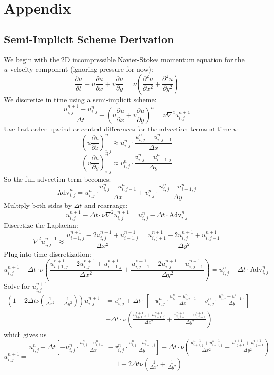 \section{Appendix}
\subsection{Semi-Implicit Scheme Derivation}

We begin with the 2D incompressible Navier-Stokes momentum equation for the $u$-velocity component (ignoring pressure for now):
\[
\frac{\partial u}{\partial t} + u \frac{\partial u}{\partial x} + v \frac{\partial u}{\partial y} = \nu \left( \frac{\partial^2 u}{\partial x^2} + \frac{\partial^2 u}{\partial y^2} \right)
\]
We discretize in time using a semi-implicit scheme:
\[
\frac{u^{n+1}_{i,j} - u^n_{i,j}}{\Delta t} + \left( u \frac{\partial u}{\partial x} + v \frac{\partial u}{\partial y} \right)^n = \nu \nabla^2 u^{n+1}_{i,j}
\]
Use first-order upwind or central differences for the advection terms at time $n$:
\[
\left( u \frac{\partial u}{\partial x} \right)^n_{i,j} \approx u^n_{i,j} \cdot \frac{u^n_{i,j} - u^n_{i,j-1}}{\Delta x}
\]
\[
\left( v \frac{\partial u}{\partial y} \right)^n_{i,j} \approx v^n_{i,j} \cdot \frac{u^n_{i,j} - u^n_{i-1,j}}{\Delta y}
\]
So the full advection term becomes:
\[
\text{Adv}^n_{i,j} = u^n_{i,j} \cdot \frac{u^n_{i,j} - u^n_{i,j-1}}{\Delta x} + v^n_{i,j} \cdot \frac{u^n_{i,j} - u^n_{i-1,j}}{\Delta y}
\]
Multiply both sides by $\Delta t$ and rearrange:
\[
u^{n+1}_{i,j} - \Delta t \cdot \nu \nabla^2 u^{n+1}_{i,j} = u^n_{i,j} - \Delta t \cdot \text{Adv}^n_{i,j}
\]
Discretize the Laplacian:
\[
\nabla^2 u^{n+1}_{i,j} \approx
\frac{u^{n+1}_{i+1,j} - 2u^{n+1}_{i,j} + u^{n+1}_{i-1,j}}{\Delta x^2} +
\frac{u^{n+1}_{i,j+1} - 2u^{n+1}_{i,j} + u^{n+1}_{i,j-1}}{\Delta y^2}
\]
Plug into time discretization:
\[
u^{n+1}_{i,j} - \Delta t \cdot \nu \left(
\frac{u^{n+1}_{i+1,j} - 2u^{n+1}_{i,j} + u^{n+1}_{i-1,j}}{\Delta x^2} +
\frac{u^{n+1}_{i,j+1} - 2u^{n+1}_{i,j} + u^{n+1}_{i,j-1}}{\Delta y^2}
\right)
= u^n_{i,j} - \Delta t \cdot \text{Adv}^n_{i,j}
\]
Solve for \(u^{n+1}_{i,j}\)
\begin{align*}
    \left(1 + 2\Delta t \nu \left( \frac{1}{\Delta x^2} + \frac{1}{\Delta y^2} \right) \right) u^{n+1}_{i,j} &=
    u^n_{i,j} + \Delta t \cdot \left[
    - u^n_{i,j} \cdot \frac{u^n_{i,j} - u^n_{i,j-1}}{\Delta x}
    - v^n_{i,j} \cdot \frac{u^n_{i,j} - u^n_{i-1,j}}{\Delta y}
    \right] \\
    & + \Delta t \cdot \nu \left(
    \frac{u^{n+1}_{i+1,j} + u^{n+1}_{i-1,j}}{\Delta x^2} +
    \frac{u^{n+1}_{i,j+1} + u^{n+1}_{i,j-1}}{\Delta y^2}
    \right)
\end{align*}
which gives us
\[
u^{n+1}_{i,j} =
\frac{
u^n_{i,j} + \Delta t \left[
- u^n_{i,j} \cdot \frac{u^n_{i,j} - u^n_{i,j-1}}{\Delta x}
- v^n_{i,j} \cdot \frac{u^n_{i,j} - u^n_{i-1,j}}{\Delta y}
\right] +
\Delta t \cdot \nu \left(
\frac{u^{n+1}_{i+1,j} + u^{n+1}_{i-1,j}}{\Delta x^2} +
\frac{u^{n+1}_{i,j+1} + u^{n+1}_{i,j-1}}{\Delta y^2}
\right)
}{
1 + 2 \Delta t \nu \left( \frac{1}{\Delta x^2} + \frac{1}{\Delta y^2} \right)
}
\]
